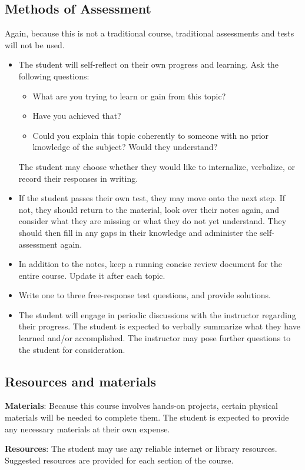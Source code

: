 \documentclass[12pt]{article}
\begin{document}
	\subsection{Methods of Assessment}
		Again, because this is not a traditional course, traditional assessments and tests will not be used. 
			\begin{itemize}
				\item The student will self-reflect on their own progress and learning. Ask the following questions:
				\begin{itemize}
					\item What are you trying to learn or gain from this topic?
					\item Have you achieved that?
					\item Could you explain this topic coherently to someone with no prior knowledge of the subject? Would they understand?
				\end{itemize}
				The student may choose whether they would like to internalize, verbalize, or record their responses in writing. 
				\item If the student passes their own test, they may move onto the next step. If not, they should return to the material, look over their notes again, and consider what they are missing or what they do not yet understand. They should then fill in any gaps in their knowledge and administer the self-assessment again. 
				\item In addition to the notes, keep a running concise review document for the entire course. Update it after each topic.  
				\item Write one to three free-response test questions, and provide solutions. 
				\item The student will engage in periodic discussions with the instructor regarding their progress. The student is expected to verbally summarize what they have learned and/or accomplished. The instructor may pose further questions to the student for consideration. 
			\end{itemize}
	\subsection{Resources and materials}
		\textbf{Materials}: Because this course involves hands-on projects, certain physical materials will be needed to complete them. The student is expected to provide any necessary materials at their own expense. 

		\textbf{Resources}: The student may use any reliable internet or library resources. Suggested resources are provided for each section of the course.  
\end{document}
